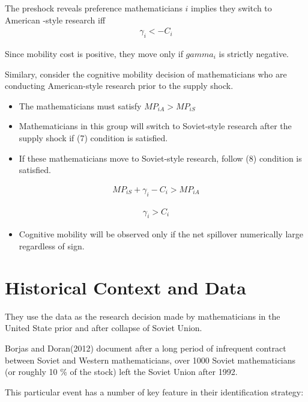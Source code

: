 \documentclass[../root]{subfiles}
\begin{document}
    The preshock reveals preference mathematicians $i$ implies they switch to American -style research iff 
    \begin{align}
        \gamma_i < -C_i
    \end{align}
    
    Since mobility cost is positive, they move only if $gamma_i$ is strictly negative.
    
    Similary, consider the cognitive mobility decision of mathematicians who are conducting American-style research prior to the supply shock. 
    \begin{itemize}
        \item The mathematicians must satisfy $MP_{iA} > MP_{iS}$
        \item Mathematicians in this group will switch to Soviet-style research after the supply shock if (7) condition is satisfied.
        \item If these mathematicians move to Soviet-style research, follow (8) condition is satisfied. 
    \end{itemize}
    
    \begin{align}
         MP_{iS} + \gamma_i -C_i > MP_{iA}
     \end{align}
     
     \begin{align}
         \gamma_i > C_i
     \end{align}
     
     \begin{itemize}
         \item Cognitive mobility will be observed only if the net spillover numerically large regardless of sign.
     \end{itemize}
     
     \section{Historical Context and Data}
     They use the data as the research decision made by mathematicians in the United State prior and after collapse of Soviet Union.
     
     Borjas and Doran(2012) document after a long period of infrequent contract between Soviet and Western mathematicians, over 1000 Soviet mathematicians (or roughly 10 \% of the stock) left the Soviet Union after 1992. 
     
     This particular event has a number of key feature in their identification strategy:
     
\end{document}
